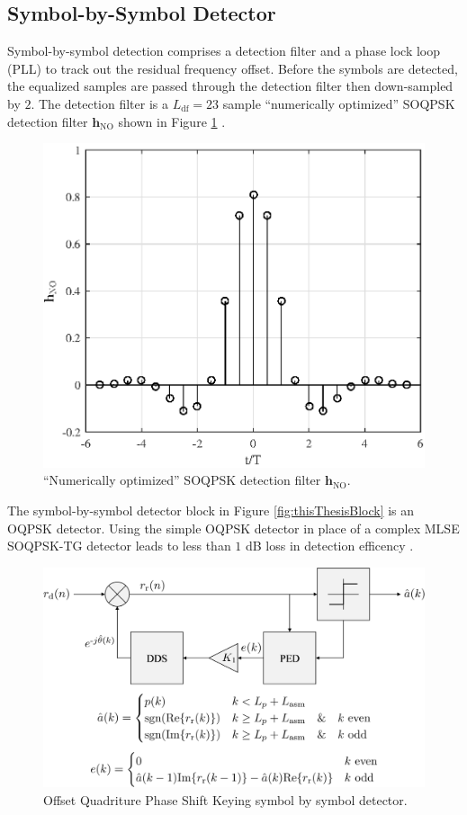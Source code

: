 \subsection{Symbol-by-Symbol Detector}
\label{sec:oqpsk_detector}
Symbol-by-symbol detection comprises a detection filter and a phase lock loop (PLL) to track out the residual frequency offset.
Before the symbols are detected, the equalized samples are passed through the detection filter then down-sampled by $2$. 
The detection filter is a $L_\text{df} = 23$ sample ``numerically optimized'' SOQPSK detection filter $\mathbf{h}_\text{NO}$ shown in Figure \ref{fig:detectionFilter}
\cite[Fig. 3]{perrins:2013}.
\begin{figure}
	\centering\includegraphics[width=5in]{figures/eq_equations/df.eps}
	\caption{``Numerically optimized'' SOQPSK detection filter $\mathbf{h}_\text{NO}$.}
	\label{fig:detectionFilter}
\end{figure}
The symbol-by-symbol detector block in Figure \ref{fig:thisThesisBlock} is an OQPSK detector.
Using the simple OQPSK detector in place of a complex MLSE SOQPSK-TG detector leads to less than $1$ dB loss in detection efficency \cite{perrins:2013}.
\begin{figure}
	\centering\includegraphics[width=9.11in/100*55]{figures/systemOverview/OQPSK.pdf}
	\caption{Offset Quadriture Phase Shift Keying symbol by symbol detector.}
	\label{fig:OQPSK}
\end{figure}

